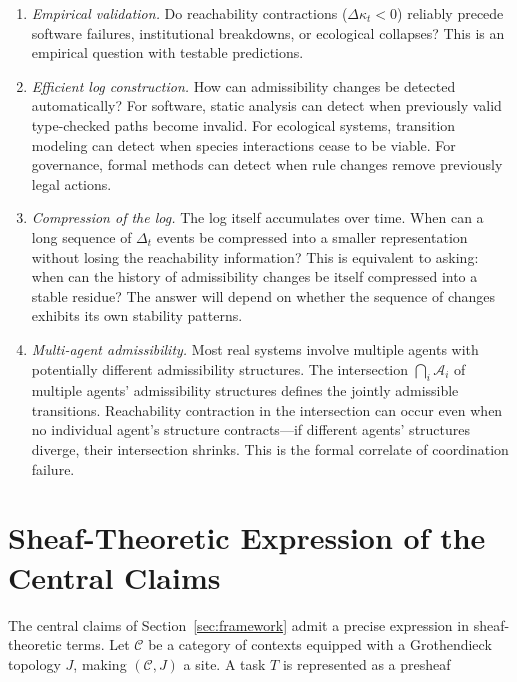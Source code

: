 \documentclass[12pt, a4paper]{article}
\theoremstyle{plain}
\theoremstyle{definition}
\theoremstyle{remark}
\begin{document}
\begin{enumerate}[leftmargin=*, label=(\roman*)]
\item \emph{Empirical validation.} Do reachability contractions ($\Delta\kappa_t < 0$)
reliably precede software failures, institutional breakdowns, or ecological
collapses? This is an empirical question with testable predictions.

\item \emph{Efficient log construction.} How can admissibility changes be
detected automatically? For software, static analysis can detect when
previously valid type-checked paths become invalid. For ecological systems,
transition modeling can detect when species interactions cease to be viable.
For governance, formal methods can detect when rule changes remove previously
legal actions.

\item \emph{Compression of the log.} The log itself accumulates over time.
When can a long sequence of $\Delta_t$ events be compressed into a smaller
representation without losing the reachability information? This is
equivalent to asking: when can the history of admissibility changes be
itself compressed into a stable residue? The answer will depend on whether
the sequence of changes exhibits its own stability patterns.

\item \emph{Multi-agent admissibility.} Most real systems involve multiple
agents with potentially different admissibility structures. The intersection
$\bigcap_i \mathcal{A}_i$ of multiple agents' admissibility structures
defines the jointly admissible transitions. Reachability contraction in
the intersection can occur even when no individual agent's structure
contracts---if different agents' structures diverge, their intersection
shrinks. This is the formal correlate of coordination failure.
\end{enumerate}

\section{Sheaf-Theoretic Expression of the Central Claims}
\label{app:sheaf}

The central claims of Section~\ref{sec:framework} admit a precise expression
in sheaf-theoretic terms. Let $\mathcal{C}$ be a category of contexts equipped
with a Grothendieck topology $J$, making $(\mathcal{C}, J)$ a site. A task
$T$ is represented as a presheaf
\end{document}
